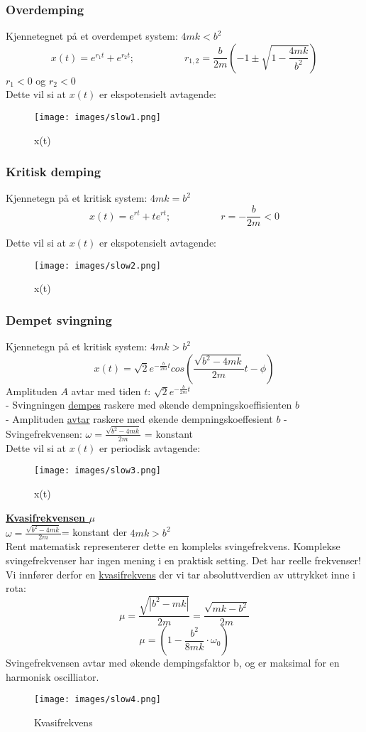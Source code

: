 \documentclass[12pt]{article}
\begin{document}
\subsubsection{Overdemping}
Kjennetegnet på et overdempet system: $4mk < b^2$
$$x(t) = e^{r_1t} + e^{r_2t}; \hspace{5em} r_{1,2} = \frac{b}{2m}\left(-1 \pm \sqrt{1-\frac{4mk}{b^2}}\right)$$
$r_1 < 0$ og $r_2 < 0$\\
Dette vil si at $x(t)$ er ekspotensielt avtagende:
\begin{figure} [H]
    \centering
    \texttt{[image: images/slow1.png]}
    \caption{x(t)}
\end{figure}

\subsubsection{Kritisk demping}
Kjennetegn på et kritisk system: $4mk = b^2$
$$x(t) = e^{rt} + te^{rt}; \hspace{5em} r = -\frac{b}{2m} < 0$$

Dette vil si at $x(t)$ er ekspotensielt avtagende:
\begin{figure} [H]
    \centering
    \texttt{[image: images/slow2.png]}
    \caption{x(t)}
\end{figure}

\subsubsection{Dempet svingning}
Kjennetegn på et kritisk system: $4mk > b^2$
$$x(t) = \sqrt{2}e^{-\frac{b}{2m}t} cos \left( \frac{\sqrt{b^2-4mk}}{2m}t-\phi  \right)$$
Amplituden $A$ avtar med tiden $t$: $\sqrt{2}e^{-\frac{b}{2m}t}$\\
- Svingningen \underline{dempes} raskere med økende dempningskoeffisienten $b$\\
- Amplituden \underline{avtar} raskere med økende dempningskoeffesient $b$
- Svingefrekvensen: $\omega = \frac{\sqrt{b^2-4mk}}{2m}$ = konstant\\
Dette vil si at $x(t)$ er periodisk avtagende:
\begin{figure} [H]
    \centering
    \texttt{[image: images/slow3.png]}
    \caption{x(t)}
\end{figure}
\bigskip
\textbf{\underline{Kvasifrekvensen $\mu$}}\\
\bigskip
$\omega = \frac{\sqrt{b^2-4mk}}{2m}$= konstant der $4mk > b^2$\\
Rent matematisk representerer dette en kompleks svingefrekvens. Komplekse svingefrekvenser har ingen mening i en praktisk setting. Det har reelle frekvenser!\\
\bigskip
Vi innfører derfor en \underline{kvasifrekvens} der vi tar absoluttverdien av uttrykket inne i rota:
$$\mu = \frac{\sqrt{|b^2-mk|}}{2m} = \frac{\sqrt{mk-b^2}}{2m}$$
$$\mu = \left(1-\frac{b^2}{8mk}\cdot \omega_0 \right)$$
Svingefrekvensen avtar med økende dempingsfaktor b, og er maksimal for en harmonisk oscilliator.
\begin{figure} [H]
    \centering
    \texttt{[image: images/slow4.png]}
    \caption{Kvasifrekvens}
\end{figure}
\pagebreak
\end{document}
